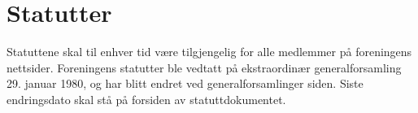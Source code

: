 \section{Statutter}
Statuttene skal til enhver tid være tilgjengelig for alle medlemmer på
foreningens nettsider. Foreningens statutter ble vedtatt på ekstraordinær
generalforsamling 29. januar 1980, og har blitt endret ved generalforsamlinger
siden. Siste endringsdato skal stå på forsiden av statuttdokumentet.
